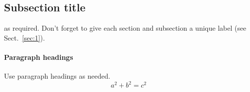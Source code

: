 \subsection{Subsection title}
\label{sec:2}
as required. Don't forget to give each section
and subsection a unique label (see Sect.~\ref{sec:1}).
\paragraph{Paragraph headings} Use paragraph headings as needed.
\begin{equation}
a^2+b^2=c^2
\end{equation}





%
%



